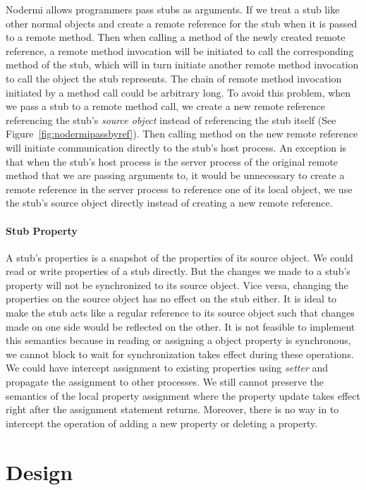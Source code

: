 Nodermi allows programmers pass stubs as arguments.
If we treat a stub like other normal objects and create a remote reference 
 for the stub when it is passed to a remote method. 
Then when calling a method of the newly created remote reference,
a remote method invocation will be initiated to call the corresponding method
of the stub, which will in turn initiate another remote method invocation
to call the object the stub represents.
The chain of remote method invocation initiated by a method call could
be arbitrary long.
To avoid this problem, when we pass a stub to a remote method call,
we create a new remote reference referencing 
 the stub's \emph{source object} instead of referencing the stub itself
 (See Figure~\ref{fig:nodermipassbyref}).
Then calling method on the new remote reference will initiate 
communication directly to the stub's host process.
An exception is that when the stub's host process is the server
process of the original remote method that we are passing arguments to,
it would be unnecessary to create a remote reference 
in the server process to reference one of its local object,
we use the stub's source object directly instead of 
creating a new remote reference.


\paragraph{Stub Property}
A stub's properties is a snapshot of the properties
of its source object.
We could read or write properties of a stub directly.
But the changes we made to a stub's property
will not be synchronized to its source object.
Vice versa,
changing the properties on the source object has no effect
on the stub either.
It is ideal to make the stub acts like a regular reference
to its source object such that
changes made on one side would be reflected on the other.
It is not feasible to implement this semantics because
in \js{} reading or assigning a object property is synchronous,
we cannot block to wait for synchronization takes effect
 during these operations.
We could have intercept assignment to existing properties using
\emph{setter} and propagate the assignment to other processes.
We still cannot preserve the semantics of the local property assignment
where the property update takes effect right after the assignment statement returns.
Moreover, there is no way in \js{} to intercept the operation of
adding a new property or deleting a property.


\section{Design}

